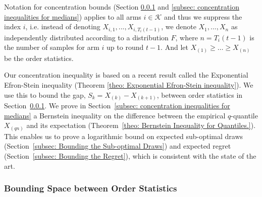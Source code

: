 Notation for concentration bounds (Section \ref{subsec: Bounding the space between order statistics} and \ref{subsec: concentration inequalities for medians}) applies to all arms $i \in \mathcal{K}$ and thus we suppress the index $i$,
i.e. instead of denoting $X_{i,1}, ..., X_{i,T_i(t-1)}$, we denote $X_{1}, ..., X_{n}$ as independently distributed according to a distribution $F$, where $n = T_i(t-1)$ is the number of samples for arm $i$ up to round $t-1$.
And let $X_{\left(1\right)} \geq \ldots \geq X_{\left(n\right)}$ be the order statistics.

Our concentration inequality is based on a recent result called the
Exponential Efron-Stein inequality \cite{boucheron2012} (Theorem \ref{theo: Exponential Efron-Stein inequality}).
We use this to bound the gap, $S_{k} = X_{\left(k\right)}-X_{\left(k+1\right)}$,
between order statistics in Section~\ref{subsec: Bounding the space between order statistics}.
We prove in Section~\ref{subsec: concentration inequalities for medians}
a Bernstein inequality on the difference
between the empirical $q$-quantile $X_{(qn)}$ and its expectation (Theorem~\ref{theo: Bernstein Inequality for Quantiles.}).
This enables us to prove a logarithmic bound
on expected sub-optimal draws (Section~\ref{subsec: Bounding the Sub-optimal Draws})
and expected regret (Section~\ref{subsec: Bounding the Regret}),
which is consistent with the state of the art.

\subsubsection{Bounding Space between Order Statistics}
\label{subsec: Bounding the space between order statistics}



